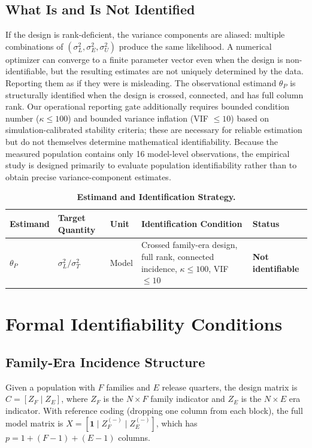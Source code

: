 \documentclass{ieeeaccess}
\theoremstyle{definition}
\theoremstyle{plain}
\begin{document}
\subsection{What Is and Is Not Identified}
If the design is rank-deficient, the variance components are aliased: multiple combinations of $(\sigma^2_L, \sigma^2_E, \sigma^2_U)$ produce the same likelihood. A numerical optimizer can converge to a finite parameter vector even when the design is non-identifiable, but the resulting estimates are not uniquely determined by the data. Reporting them as if they were is misleading. The observational estimand $\theta_P$ is structurally identified when the design is crossed, connected, and has full column rank. Our operational reporting gate additionally requires bounded condition number ($\kappa \leq 100$) and bounded variance inflation (VIF $\leq 10$) based on simulation-calibrated stability criteria; these are necessary for reliable estimation but do not themselves determine mathematical identifiability. Because the measured population contains only 16 model-level observations, the empirical study is designed primarily to evaluate population identifiability rather than to obtain precise variance-component estimates.

\begin{table}[!t]
\caption{\textbf{Estimand and Identification Strategy.}}
\label{tab:estimands}
\centering
\footnotesize
\begin{tabular}{p{65pt}p{80pt}p{50pt}p{160pt}p{80pt}}
\hline
\textbf{Estimand} & \textbf{Target Quantity} & \textbf{Unit} & \textbf{Identification Condition} & \textbf{Status} \\
\hline
$\theta_P$ & $\sigma^2_L / \sigma^2_T$ & Model & Crossed family-era design, full rank, connected incidence, $\kappa \leq 100$, VIF $\leq 10$ & \textbf{Not identifiable} \\
\hline
\end{tabular}
\end{table}

\section{Formal Identifiability Conditions}
\label{sec:ident}

\subsection{Family-Era Incidence Structure}
Given a population with $F$ families and $E$ release quarters, the design matrix is $C = [Z_F \mid Z_E]$, where $Z_F$ is the $N \times F$ family indicator and $Z_E$ is the $N \times E$ era indicator. With reference coding (dropping one column from each block), the full model matrix is $X = [\mathbf{1} \mid Z_F^{(-)} \mid Z_E^{(-)}]$, which has $p = 1 + (F-1) + (E-1)$ columns.
\end{document}
